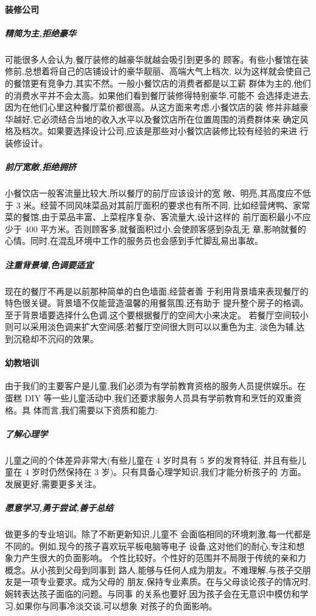 \paragraph{装修公司}
\subparagraph{精简为主,拒绝豪华}
可能很多人会认为,餐厅装修的越豪华就越会吸引到更多的
顾客。有些小餐馆在装修前,总想着将自己的店铺设计的豪华靓丽、高端大气上档次,
以为这样就会使自己的餐馆更有竞争力,其实不然。一般小餐饮店的消费者都是以工薪
群体为主的,他们的消费水平并不会太高。如果他们看到餐厅装修得特别豪华,可能不
会选择走进去,因为在他们心里这种餐厅菜价都很高。从这方面来考虑,小餐饮店的装
修并非越豪华越好,它必须结合当地的收入水平以及餐饮店所在位置周围的消费群体来
确定风格及档次。如果要选择设计公司,应该是那些对小餐饮店装修比较有经验的来进
行装修设计。
\subparagraph{ 前厅宽敞,拒绝拥挤 }
小餐饮店一般客流量比较大,所以餐厅的前厅应该设计的宽
敞、明亮,其高度应不低于 3 米。经营不同风味菜品对其前厅面积的要求也有所不同,
比如经营烤鸭、家常菜的餐馆,由于菜品丰富、上菜程序复杂、客流量大,设计这样的
前厅面积最小不应少于 400 平方米。否则顾客多,就餐面积过小,会使顾客感到杂乱无
章,影响就餐的心情。同时,在混乱环境中工作的服务员也会感到手忙脚乱易出事故。
\subparagraph{ 注重背景墙,色调要适宜 }
现在的餐厅不再是以前那种简单的白色墙面,经营者善
于利用背景墙来表现餐厅的特色很关键。背景墙不仅能营造温馨的用餐氛围,还有助于
提升整个房子的格调。至于背景墙要选择什么色调,这个要根据餐厅的空间大小来决定。
若餐厅空间较小则可以采用淡色调来扩大空间感;若餐厅空间很大则可以以重色为主,
淡色为辅,达到沉稳却不沉闷的效果。

\paragraph{幼教培训}
由于我们的主要客户是儿童,我们必须为有学前教育资格的服务人员提供娱乐。在
蛋糕 DIY 等一些儿童活动中,我们还要求服务人员具有学前教育和烹饪的双重资格。具
体而言,我们需要以下资质和能力:

\subparagraph{ 了解心理学 }
儿童之间的个体差异非常大(有些儿童在 4 岁时具有 5 岁的发育特征,
并且有些儿童在 4 岁时仍然保持在 3 岁)。只有具备心理学知识,我们才能分析孩子的
方面。发展更好,需要更多关注。

\subparagraph{ 愿意学习,勇于尝试,善于总结 }
做更多的专业培训。除了不断更新知识,儿童不
会面临相同的环境刺激,每一代都是不同的。例如,现今的孩子喜欢玩平板电脑等电子
设备,这对他们的耐心,专注和想象力产生很大的负面影响。
个性比较好。个性好的范围并不局限于传统的亲和力概念。从小孩到父母到同事到
路人,能够与任何人成为朋友。不难理解,与孩子交朋友是一项专业要求。成为父母的
朋友,保持专业素质。在与父母谈论孩子的情况时,婉转表达孩子面临的问题。与同事
的关系也要好,因为孩子会在无意识中模仿和学习,如果你与同事冷淡交谈,可以想象
对孩子的负面影响。

